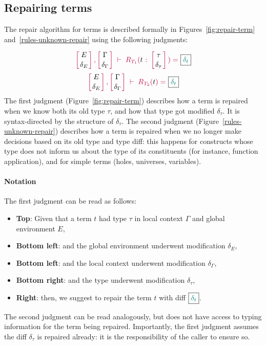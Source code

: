\subsection{Repairing terms} \label{chick-design-repair-term}

The repair algorithm for terms is described formally in
Figures~\ref{fig:repair-term} and~\ref{rules-unknown-repair} using the following
judgments:

{
  \[
    {\turnstile
      { \dcontext{E}{\delta_E}{\Gamma}{\delta_\Gamma} }
      {\repair{t}{\delta_t}{\tau}{\delta_\tau}}
    }
  \]
  \[
    {\turnstile
      { \dcontext{E}{\delta_E}{\Gamma}{\delta_\Gamma} }
      {\repairTermWithoutType{t}{\delta_t}}
    }
  \]
}%
%
The first judgment (Figure~\ref{fig:repair-term}) describes how a term is
repaired when we know both its old type $\tau$, and how that type got modified
$\delta_\tau$.  It is syntax-directed by the structure of $\delta_\tau$.  The
second judgment (Figure~\ref{rules-unknown-repair}) describes how a term is
repaired when we no longer make decisions based on its old type and type diff:
this happens for constructs whose type does not inform us about the type of its
constituents (for instance, function application), and for simple terms (holes,
universes, variables).

\paragraph{Notation} The first judgment can be read as follows:

\begin{itemize}

  \item \textbf{Top}: Given that a term $t$ had type $\tau$ in local context
$\Gamma$ and global environment $E$,

  \item \textbf{Bottom left}: and the global environment underwent modification
$\delta_{E}$,

  \item \textbf{Bottom left}: and the local context underwent modification
$\delta_{\Gamma}$,

  \item \textbf{Bottom right}: and the type underwent modification
$\delta_{\tau}$,

  \item \textbf{Right}: then, we suggest to repair the term $t$ with diff
$\boxed{ \textcolor{teal}{\delta_{t}} }$.

\end{itemize}

\noindent The second judgment can be read analogously, but does not have access
to typing information for the term being repaired.  Importantly, the first
judgment assumes the diff $\delta_\tau$ is repaired already: it is the
responsibility of the caller to ensure so.




